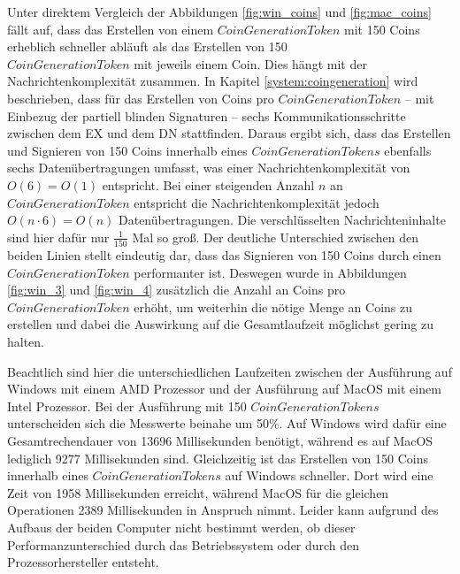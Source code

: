 \documentclass[
	fontsize=11pt,
	headings=small,
	parskip=half,           %
	bibliography=totoc,
	numbers=noenddot,       %
	open=any,               %
]{scrreprt}
\begin{document}
Unter direktem Vergleich der Abbildungen \ref{fig:win_coins} und \ref{fig:mac_coins} fällt auf, dass das Erstellen von einem $CoinGenerationToken$ mit 150 Coins erheblich schneller abläuft als das Erstellen von 150 \\$CoinGenerationToken$ mit jeweils einem Coin. Dies hängt mit der Nachrichtenkomplexität zusammen. In Kapitel \ref{system:coingeneration} wird beschrieben, dass für das Erstellen von Coins pro $CoinGenerationToken$ -- mit Einbezug der partiell blinden Signaturen -- sechs Kommunikationsschritte zwischen dem EX und dem DN stattfinden. Daraus ergibt sich, dass das Erstellen und Signieren von 150 Coins innerhalb eines $CoinGenerationTokens$ ebenfalls sechs Datenübertragungen umfasst, was einer Nachrichtenkomplexität von $O(6)=O(1)$ entspricht. Bei einer steigenden Anzahl $n$ an $CoinGenerationToken$ entspricht die Nachrichtenkomplexität jedoch $O(n\cdot6)=O(n)$ Datenübertragungen. Die verschlüsselten Nachrichteninhalte sind hier dafür nur $\frac{1}{150}$ Mal so groß. Der deutliche Unterschied zwischen den beiden Linien stellt eindeutig dar, dass das Signieren von 150 Coins durch einen $CoinGenerationToken$ performanter ist. Deswegen wurde in Abbildungen \ref{fig:win_3} und \ref{fig:win_4} zusätzlich die Anzahl an Coins pro $CoinGenerationToken$ erhöht, um weiterhin die nötige Menge an Coins zu erstellen und dabei die Auswirkung auf die Gesamtlaufzeit möglichst gering zu halten.

Beachtlich sind hier die unterschiedlichen Laufzeiten zwischen der Ausführung auf Windows mit einem AMD Prozessor und der Ausführung auf MacOS mit einem Intel Prozessor. Bei der Ausführung mit 150 $CoinGenerationTokens$ unterscheiden sich die Messwerte beinahe um 50\%. Auf Windows wird dafür eine Gesamtrechendauer von 13696 Millisekunden benötigt, während es auf MacOS lediglich 9277 Millisekunden sind. Gleichzeitig ist das Erstellen von 150 Coins innerhalb eines $CoinGenerationTokens$ auf Windows schneller. Dort wird eine Zeit von 1958 Millisekunden erreicht, während MacOS für die gleichen Operationen 2389 Millisekunden in Anspruch nimmt. Leider kann aufgrund des Aufbaus der beiden Computer nicht bestimmt werden, ob dieser Performanzunterschied durch das Betriebssystem oder durch den Prozessorhersteller entsteht.\\
\end{document}
